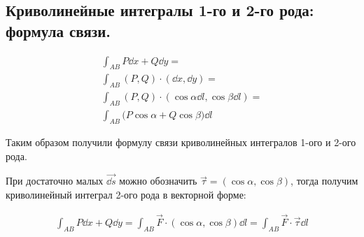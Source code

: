 \subsection{%
  Криволинейные интегралы 1-го и 2-го рода: формула связи.%
}

\begin{twocolumns}
  
  \columnbreak

  \begin{align*}
    \int_{AB} P \dd x + Q \dd y = \\
    \int_{AB} (P, Q) \cdot (\dd x, \dd y) = \\
    \int_{AB} (P, Q) \cdot (\cos \alpha \dd l, \cos \beta \dd l) = \\
    \int_{AB} \Big( P \cos \alpha + Q \cos \beta \Big) \dd l
  \end{align*}
\end{twocolumns}

Таким образом получили формулу связи криволинейных интегралов 1-ого и 2-ого
рода.

\begin{remark}
  При достаточно малых \(\vec{\dd s}\) можно обозначить
  \(\vec{\tau} = (\cos \alpha, \cos \beta)\),
  тогда получим криволинейный интеграл 2-ого рода в векторной форме:

  \begin{align*}
    \int_{AB} P \dd x + Q \dd y
    = \int_{AB} \vec{F} \cdot (\cos \alpha, \cos \beta) \dd l
    = \int_{AB} \vec{F} \cdot \vec{\tau} \dd l
  \end{align*}
\end{remark}
